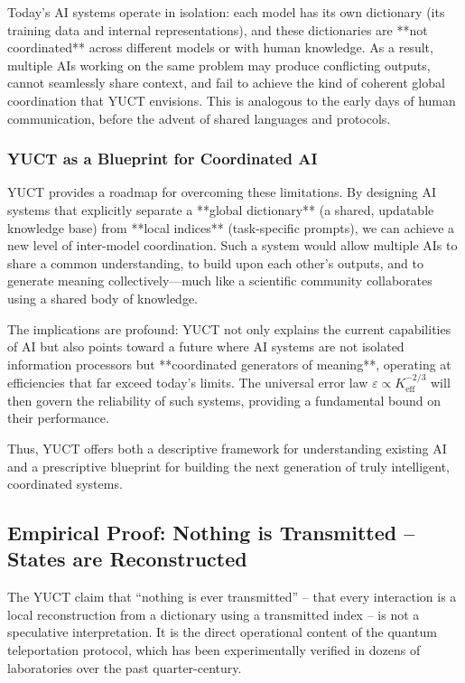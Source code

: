 \documentclass[12pt,a4paper]{article}
\theoremstyle{remark}
\begin{document}
	Today's AI systems operate in isolation: each model has its own dictionary (its training data and internal representations), and these dictionaries are **not coordinated** across different models or with human knowledge. As a result, multiple AIs working on the same problem may produce conflicting outputs, cannot seamlessly share context, and fail to achieve the kind of coherent global coordination that YUCT envisions. This is analogous to the early days of human communication, before the advent of shared languages and protocols.
	
	\subsubsection{YUCT as a Blueprint for Coordinated AI}
	
	YUCT provides a roadmap for overcoming these limitations. By designing AI systems that explicitly separate a **global dictionary** (a shared, updatable knowledge base) from **local indices** (task-specific prompts), we can achieve a new level of inter-model coordination. Such a system would allow multiple AIs to share a common understanding, to build upon each other's outputs, and to generate meaning collectively---much like a scientific community collaborates using a shared body of knowledge.
	
	The implications are profound: YUCT not only explains the current capabilities of AI but also points toward a future where AI systems are not isolated information processors but **coordinated generators of meaning**, operating at efficiencies that far exceed today's limits. The universal error law $\varepsilon \propto K_{\mathrm{eff}}^{-2/3}$ will then govern the reliability of such systems, providing a fundamental bound on their performance.
	
	Thus, YUCT offers both a descriptive framework for understanding existing AI and a prescriptive blueprint for building the next generation of truly intelligent, coordinated systems.
	
	\subsection{Empirical Proof: Nothing is Transmitted -- States are Reconstructed}
	
	The YUCT claim that ``nothing is ever transmitted'' -- that every interaction is a local
	reconstruction from a dictionary using a transmitted index -- is not a speculative
	interpretation. It is the direct operational content of the quantum teleportation
	protocol, which has been experimentally verified in dozens of laboratories over the past
	quarter-century.
	
\end{document}
